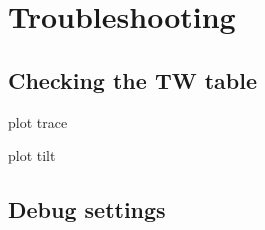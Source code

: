 \section{Troubleshooting}
\label{sec:troubleshooting}



\subsection{Checking the TW table}

plot trace

plot tilt

\subsection{Debug settings}

